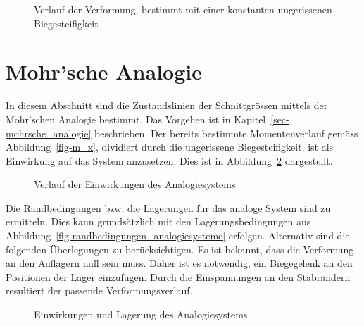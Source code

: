 \documentclass[
  12pt,
  letterpaper,
  egregdoesnotlikesansseriftitles]{scrreprt}
\begin{document}
\begin{figure}[H]


\caption{\label{fig-w_x}Verlauf der Verformung, bestimmt mit einer
konstanten ungerissenen Biegesteifigkeit}

\end{figure}%

\section{Mohr'sche Analogie}\label{mohrsche-analogie}

In diesem Abschnitt sind die Zustandslinien der Schnittgrössen mittels
der Mohr'schen Analogie bestimmt. Das Vorgehen ist in
Kapitel~\ref{sec-mohrsche_analogie} beschrieben. Der bereits bestimmte
Momentenverlauf gemäss Abbildung~\ref{fig-m_x}, dividiert durch die
ungerissene Biegesteifigkeit, ist als Einwirkung auf das System
anzusetzen. Dies ist in Abbildung~\ref{fig-q_x_mohr} dargestellt.

\begin{figure}[H]


\caption{\label{fig-q_x_mohr}Verlauf der Einwirkungen des
Analogiesystems}

\end{figure}%

Die Randbedingungen bzw. die Lagerungen für das analoge System sind zu
ermitteln. Dies kann grundsätzlich mit den Lagerungsbedingungen aus
Abbildung~\ref{fig-randbedingungen_analogiesysteme} erfolgen. Alternativ
sind die folgenden Überlegungen zu berücksichtigen. Es ist bekannt, dass
die Verformung an den Auflagern null sein muss. Daher ist es notwendig,
ein Biegegelenk an den Positionen der Lager einzufügen. Durch die
Einspannungen an den Stabrändern resultiert der passende
Verformungsverlauf.

\begin{figure}[H]


\caption{\label{fig-system_analog}Einwirkungen und Lagerung des
Analogiesystems}

\end{figure}%
\end{document}
